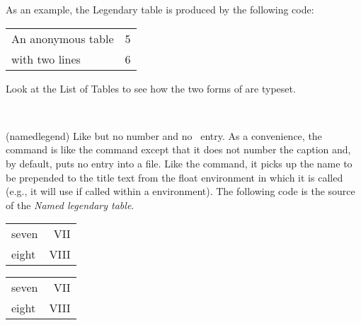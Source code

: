  As an example, the \textsf{Legendary table} is produced by the following code:
\begin{lcode}
\begin{table}
\centering
\captiontitlefont{\sffamily}
\begin{tabular}{lc} \toprule
   An anonymous table & 5 \\
   with two lines     & 6 \\ \bottomrule
\end{tabular}
\end{table}
\end{lcode}
 Look at the List of Tables to see how the two forms of \cmd{\addcontentsline}
are typeset.


\begin{syntax}
\cmd{\namedlegend} \\
\end{syntax}
\glossary(namedlegend)%
  {}%
  {Like  but no number and no \listofx\ entry.}
 As a convenience, the \cmd{\namedlegend}
command is like the \cmd{\caption} command except that it does not number
the caption and, by default, puts no entry into a \listofx{} file. Like
the \cmd{\caption} command, it picks up the name to be prepended to the
title text from the float environment in which it is called (e.g.,
it will use \cmd{\tablename} if called within a  environment). The
following code is the source of the \textit{Named legendary table}.
 \begin{lcode}
 \begin{table}
 \centering
 \captionnamefont{\sffamily}
 \captiontitlefont{\itshape}
 \begin{tabular}{lr} \toprule
 seven & VII \\
 eight & VIII \\ \bottomrule
 \end{tabular}
 \end{table}
 \end{lcode}

 \begin{shadetable}
 \captionnamefont{\sffamily}
 \captiontitlefont{\itshape}
 \begin{tabular}{lr} \toprule
 seven & VII \\
 eight & VIII \\ \bottomrule
 \end{tabular}
 \end{shadetable}

